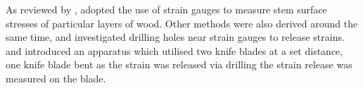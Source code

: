 As reviewed by \cite{kubler_1987}, \cite{Okuyama_1981} adopted the use of strain gauges to measure stem surface
stresses of particular layers of wood. Other methods were also derived around
the same time, \cite{gueneau1973}\cite{gueneau1973b} and \cite{kikata1977} investigated drilling holes near strain gauges to release strains.
\cite{Gueneau1974} and \cite{Saurat_1976} introduced an apparatus which utilised two knife
blades at a set distance, one knife blade bent as the strain was released via
drilling the strain release was measured on the blade. 


